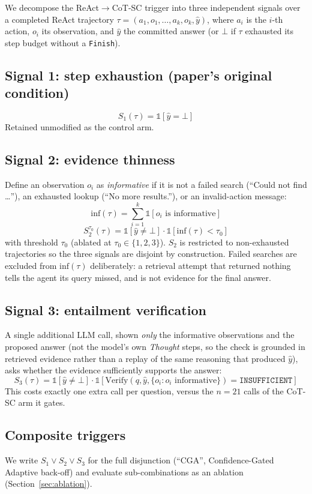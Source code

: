 We decompose the ReAct$\to$CoT-SC trigger into three independent signals
over a completed ReAct trajectory $\tau = (a_1, o_1, \ldots, a_k, o_k,
\hat{y})$, where $a_i$ is the $i$-th action, $o_i$ its observation, and
$\hat{y}$ the committed answer (or $\bot$ if $\tau$ exhausted its step
budget without a \texttt{Finish}).

\subsection{Signal 1: step exhaustion (paper's original condition)}
\[
S_1(\tau) = \mathbb{1}[\hat{y} = \bot]
\]
Retained unmodified as the control arm.

\subsection{Signal 2: evidence thinness}
Define an observation $o_i$ as \emph{informative} if it is not a failed
search (``Could not find \ldots''), an exhausted lookup (``No more
results.''), or an invalid-action message:
\[
\mathrm{inf}(\tau) = \sum_{i=1}^{k} \mathbb{1}[o_i \text{ is informative}]
\]
\[
S_2^{\tau_0}(\tau) = \mathbb{1}[\hat{y} \neq \bot] \cdot
  \mathbb{1}[\mathrm{inf}(\tau) < \tau_0]
\]
with threshold $\tau_0$ (ablated at $\tau_0 \in \{1, 2, 3\}$). $S_2$ is
restricted to non-exhausted trajectories so the three signals are
disjoint by construction. Failed searches are excluded from
$\mathrm{inf}(\tau)$ deliberately: a retrieval attempt that returned
nothing tells the agent its query missed, and is not evidence for the
final answer.

\subsection{Signal 3: entailment verification}
A single additional LLM call, shown \emph{only} the informative
observations and the proposed answer (not the model's own \emph{Thought}
steps, so the check is grounded in retrieved evidence rather than a replay
of the same reasoning that produced $\hat y$), asks whether the evidence
sufficiently supports the answer:
\[
S_3(\tau) = \mathbb{1}[\hat{y} \neq \bot] \cdot
  \mathbb{1}[\mathrm{Verify}(q, \hat{y}, \{o_i : o_i \text{ informative}\})
  = \texttt{INSUFFICIENT}]
\]
This costs exactly one extra call per question, versus the $n{=}21$ calls
of the CoT-SC arm it gates.

\subsection{Composite triggers}
We write $S_1 \lor S_2 \lor S_3$ for the full disjunction (``CGA'',
Confidence-Gated Adaptive back-off) and evaluate sub-combinations as an
ablation (Section~\ref{sec:ablation}).

